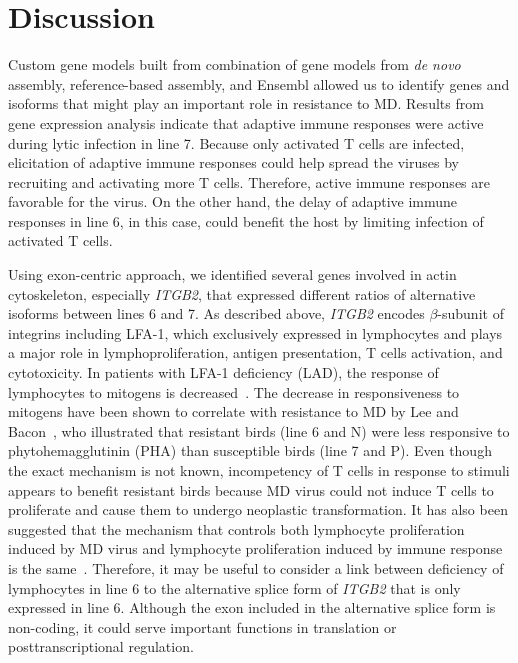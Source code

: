 \documentclass[10pt]{article}
\begin{document}
\section*{Discussion}

Custom gene models built from combination of gene models from \textit{de novo} assembly,
reference-based assembly, and Ensembl allowed us to identify genes and isoforms
that might play an important role in resistance to MD.
Results from gene expression analysis indicate that adaptive immune responses were active
during lytic infection in line 7.
Because only activated T cells are infected, elicitation of adaptive immune responses could
help spread the viruses by recruiting and activating more T cells.
Therefore, active immune responses are favorable for the virus.
On the other hand, the delay of adaptive immune responses in line 6, in this case,
could benefit the host by limiting infection of activated T cells.

Using exon-centric approach, we identified several genes involved in
actin cytoskeleton, especially \textit{ITGB2},
that expressed different ratios of alternative isoforms between lines 6 and 7.
As described above, \textit{ITGB2} encodes $\beta$-subunit of integrins including LFA-1, which exclusively
expressed in lymphocytes and plays a major role in lymphoproliferation,
antigen presentation, T cells activation, and cytotoxicity.
In patients with LFA-1 deficiency (LAD), the response of lymphocytes to mitogens is
decreased~\cite{springer1987lymphocyte}.
The decrease in responsiveness to mitogens have been shown to correlate with resistance to MD
by Lee and Bacon~\cite{lee1983ontogeny}, who illustrated that resistant birds
(line 6 and N) were less responsive to phytohemagglutinin (PHA) than susceptible birds (line 7 and P).
Even though the exact mechanism is not known, incompetency of T cells in response to
stimuli appears to benefit resistant birds because MD virus could not induce T cells
to proliferate and cause them to undergo neoplastic transformation.
It has also been suggested that the mechanism that controls
both lymphocyte proliferation induced by MD virus and lymphocyte proliferation induced by
immune response is the same~\cite{pazderka1975histocompatibility}.
Therefore, it may be useful to consider a link between deficiency of lymphocytes in line 6 to
the alternative splice form of \textit{ITGB2} that is only expressed in line 6.
Although the exon included in the alternative splice form is non-coding, it could serve important functions in
translation or posttranscriptional regulation.
\end{document}
